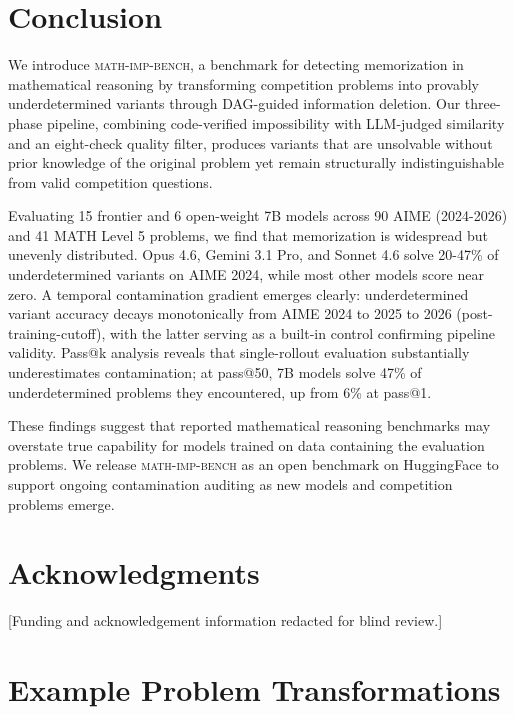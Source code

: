 \documentclass{article} %
\newcommand{\benchname}{\textsc{math-imp-bench}}
\begin{document}

\section{Conclusion}
\label{sec:conclusion}

We introduce \benchname{}, a benchmark for detecting memorization in mathematical reasoning by transforming competition problems into provably underdetermined variants through DAG-guided information deletion. Our three-phase pipeline, combining code-verified impossibility with LLM-judged similarity and an eight-check quality filter, produces variants that are unsolvable without prior knowledge of the original problem yet remain structurally indistinguishable from valid competition questions.

Evaluating 15 frontier and 6 open-weight 7B models across 90 AIME (2024-2026) and 41 MATH Level 5 problems, we find that memorization is widespread but unevenly distributed. Opus 4.6, Gemini 3.1 Pro, and Sonnet 4.6 solve 20-47\% of underdetermined variants on AIME 2024, while most other models score near zero. A temporal contamination gradient emerges clearly: underdetermined variant accuracy decays monotonically from AIME 2024 to 2025 to 2026 (post-training-cutoff), with the latter serving as a built-in control confirming pipeline validity. Pass@k analysis reveals that single-rollout evaluation substantially underestimates contamination; at pass@50, 7B models solve 47\% of underdetermined problems they encountered, up from 6\% at pass@1.

These findings suggest that reported mathematical reasoning benchmarks may overstate true capability for models trained on data containing the evaluation problems. We release \benchname{} as an open benchmark on HuggingFace to support ongoing contamination auditing as new models and competition problems emerge.



\section*{Acknowledgments}
[Funding and acknowledgement information redacted for blind review.]






\newpage
\appendix

\section{Example Problem Transformations}
\label{app:examples}
\end{document}
